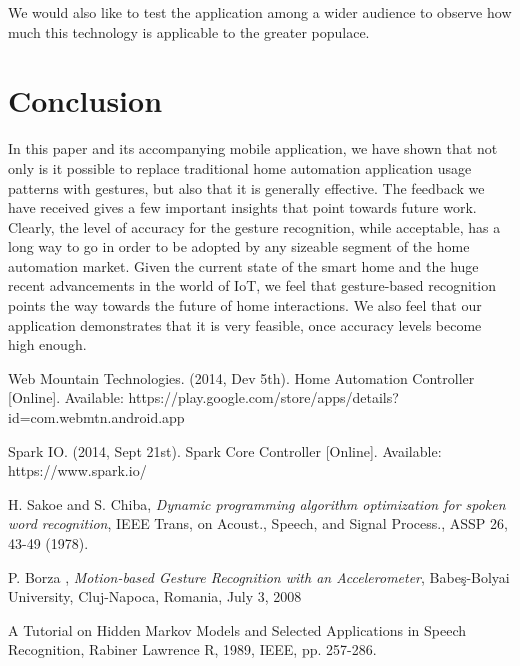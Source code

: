 \documentclass[journal]{IEEEtran}
\begin{document}
We would also like to test the application among a wider audience to observe how much this technology is applicable to the greater populace.
\section{Conclusion}

In this paper and its accompanying mobile application, we have shown that not only is it possible to replace traditional home automation application usage patterns with gestures, but also that it is generally effective. The feedback we have received gives a few important insights that point towards future work. Clearly, the level of accuracy for the gesture recognition, while acceptable, has a long way to go in order to be adopted by any sizeable segment of the home automation market. Given the current state of the smart home and the huge recent advancements in the world of IoT, we feel that gesture-based recognition points the way towards the future of home interactions. We also feel that our application demonstrates that it is very feasible, once accuracy levels become high enough. 


\raggedright
\begin{thebibliography}{1}

Web Mountain Technologies. (2014, Dev 5th). Home Automation Controller [Online]. Available: https://play.google.com/store/apps/details?id=com.webmtn.android.app


Spark IO. (2014, Sept 21st). Spark Core Controller [Online]. Available: https://www.spark.io/


H. Sakoe and S. Chiba, \emph{Dynamic programming algorithm optimization for spoken word recognition}, IEEE Trans, on Acoust., Speech, and Signal Process., ASSP 26, 43-49 (1978).

P. Borza , \emph{Motion-based Gesture Recognition with an Accelerometer}, Babe\c{s}-Bolyai University, Cluj-Napoca, Romania, July 3, 2008



A Tutorial on Hidden Markov Models and Selected Applications in Speech Recognition, Rabiner Lawrence R, 1989, IEEE, pp. 257-286.



\end{thebibliography}
\end{document}
